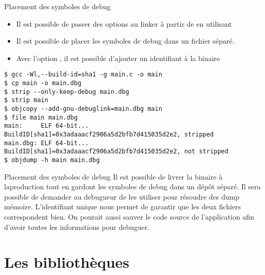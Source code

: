 \begin{frame}[fragile=singleslide]{Placement des symboles de debug}
  \begin{itemize} 
  \item Il  est possible de passer  des options au linker  à partir de
     en utilisant 
  \item  Il est  possible  de placer  les  symboles de  debug dans  un
    fichier séparé.
  \item Avec l'option , il est possible d'ajouter
    un identifiant à la binaire
  \end{itemize} 
  \begin{lstlisting}
$ gcc -Wl,--build-id=sha1 -g main.c -o main
$ cp main -o main.dbg
$ strip --only-keep-debug main.dbg
$ strip main
$ objcopy --add-gnu-debuglink=main.dbg main
$ file main main.dbg
main:     ELF 64-bit... BuildID[sha1]=0x3adaaacf2906a5d2bfb7d415035d2e2, stripped
main.dbg: ELF 64-bit... BuildID[sha1]=0x3adaaacf2906a5d2bfb7d415035d2e2, not stripped
$ objdump -h main main.dbg
  \end{lstlisting}
\end{frame}

\begin{frame}[fragile=singleslide]{Placement des symboles de debug}
  Il est possible de livrer  la binaire à laproduction tout en gardont
  les  symboles de debug  dans un  dépôt séparé.  Il sera  possible de
  demander  au  debugueur  de  les  utiliser pour  résoudre  des  dump
  mémoire. L'identifiant  unique nous permet de garantir  que les deux
  fichiers correspondent bien. On  pourait aussi sauver le code source
  de l'application afin d'avoir toutes les informations pour debuguer.
\end{frame}

\section{Les bibliothèques}

